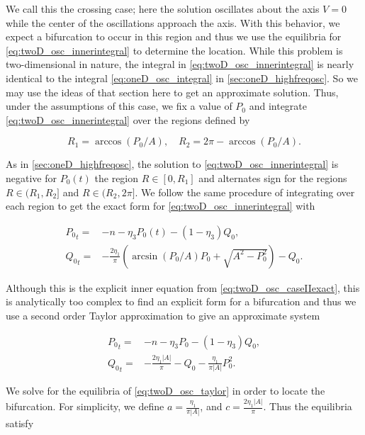 We call this the crossing case; here the solution oscillates about the axis $V=0$ while the center of the oscillations approach the axis. With this behavior, we expect a bifurcation to occur in this region and thus we use the equilibria for \eqref{eq:twoD_osc_innerintegral} to determine the location. While this problem is two-dimensional in nature, the integral in \eqref{eq:twoD_osc_innerintegral} is nearly identical to the integral \eqref{eq:oneD_osc_integral} in \autoref{sec:oneD_highfreqosc}. So we may use the ideas of that section here to get an approximate solution. Thus, under the assumptions of this case, we fix a value of $P_0$ and integrate \eqref{eq:twoD_osc_innerintegral} over the regions defined by

\begin{equation*}
R_1=\arccos(P_0/A),\quad R_2=2\pi-\arccos(P_0/A).
\end{equation*}

As in \autoref{sec:oneD_highfreqosc}, the solution to \eqref{eq:twoD_osc_innerintegral} is negative for $P_0(t)$ the region $R\in[0,R_1]$ and alternates sign for the regions $R\in (R_1,R_2]$ and $R\in (R_2,2\pi]$. We follow the same procedure of integrating over each region to get the exact form for \eqref{eq:twoD_osc_innerintegral} with

\begin{equation}\label{eq:twoD_osc_caseIIexact}
\begin{aligned}
{P_0}_t=&-n- \eta_3 P_0(t)-(1-\eta_3)Q_0,\\
{Q_0}_t=&-\frac{2\eta_1}{\pi}\left(\arcsin(P_0/A)P_0+\sqrt{A^2-P_0^2}\right)-Q_0.
\end{aligned}
\end{equation}

Although this is the explicit inner equation from \eqref{eq:twoD_osc_caseIIexact}, this is analytically too complex to find an explicit form for a bifurcation and thus we use a second order Taylor approximation to give an approximate system

\begin{equation}\label{eq:twoD_osc_taylor}
\begin{aligned}
{P_0}_t=&-n -\eta_3 P_0-(1-\eta_3)Q_0,\\
{Q_0}_t=&-\frac{2\eta_1|A|}{\pi}-Q_0-\frac{\eta_1}{\pi|A|}P_0^2.
\end{aligned}
\end{equation}

We solve for the equilibria of \eqref{eq:twoD_osc_taylor} in order to locate the bifurcation. For simplicity, we define $a=\frac{\eta_1}{\pi|A|}$, and $ c=\frac{2\eta_1|A|}{\pi}$. Thus the equilibria satisfy

